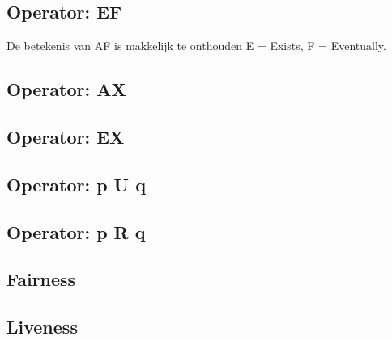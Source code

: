 \documentclass{article}%
\begin{document}
\subsection{Operator: EF}
De betekenis van AF is makkelijk te onthouden E = Exists, F = Eventually.
\subsection{Operator: AX}
\subsection{Operator: EX}
\subsection{Operator: p U q}
\subsection{Operator: p R q}
\subsection{Fairness}
\subsection{Liveness}
\newpage
\end{document}
